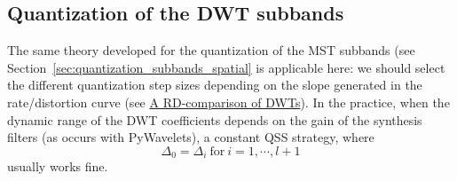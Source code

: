 
\subsection{Quantization of the DWT subbands}

The same theory developed for the quantization of the MST subbands
(see Section~\ref{sec:quantization_subbands_spatial} is applicable
here: we should select the different quantization step sizes depending
on the slope generated in the rate/distortion curve (see
\href{https://github.com/Tecnologias-multimedia/Tecnologias-multimedia.github.io/blob/master/contents/transform_coding/DWT_RD.ipynb}{A
  RD-comparison of DWTs}). In the practice, when the dynamic range of
the DWT coefficients depends on the gain of the synthesis filters (as
occurs with PyWavelets), a constant QSS strategy, where
\begin{equation}
  \Delta_0=\Delta_i~\text{for}~i=1,\cdots,l+1
\end{equation}
usually works fine.

